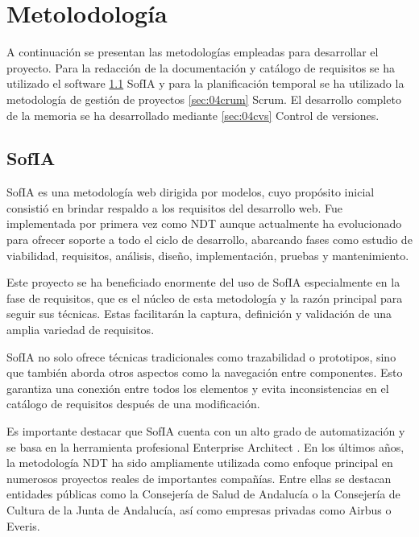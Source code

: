\chapter{Metolodología}\label{cap:04metodologia}

A continuación se presentan las metodologías empleadas para desarrollar el proyecto. Para la redacción de la documentación y catálogo de requisitos se ha utilizado el software \ref{sec:04sofia} SofIA y para la planificación temporal se ha utilizado la metodología de gestión de proyectos \ref{sec:04crum} Scrum. El desarrollo completo de la memoria se ha desarrollado mediante \ref{sec:04cvs} Control de versiones.


\section{SofIA} \label{sec:04sofia} %

SofIA \parencite{escalona2023} es una metodología web dirigida por modelos, cuyo propósito inicial consistió en brindar respaldo a los requisitos del desarrollo web. Fue implementada por primera vez como NDT aunque actualmente ha evolucionado para ofrecer soporte a todo el ciclo de desarrollo, abarcando fases como estudio de viabilidad, requisitos, análisis, diseño, implementación, pruebas y mantenimiento.

Este proyecto se ha beneficiado enormente del uso de SofIA especialmente en la fase de requisitos, que es el núcleo de esta metodología y la razón principal para seguir sus técnicas. Estas facilitarán la captura, definición y validación de una amplia variedad de requisitos.

SofIA no solo ofrece técnicas tradicionales como trazabilidad o prototipos, sino que también aborda otros aspectos como la navegación entre componentes. Esto garantiza una conexión entre todos los elementos y evita inconsistencias en el catálogo de requisitos después de una modificación.

Es importante destacar que SofIA cuenta con un alto grado de automatización y se basa en la herramienta profesional Enterprise Architect \parencite{licenciaEA}. En los últimos años, la metodología NDT ha sido ampliamente utilizada como enfoque principal en numerosos proyectos reales de importantes compañías. Entre ellas se destacan entidades públicas como la Consejería de Salud de Andalucía o la Consejería de Cultura de la Junta de Andalucía, así como empresas privadas como Airbus o Everis. 

